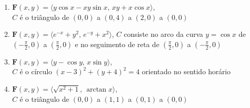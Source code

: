 \documentclass[a4paper, 12pt]{article}
\begin{document}
	\begin{enumerate}[resume]

		\item $\textbf{F}(x,y) = \langle y\cos{x} - xy\sin{x}, \, xy + x\cos{x} \rangle$, \\ $C$ é o triângulo de $(0,0)$ a $(0,4)$ a $(2,0)$ a $(0,0)$

		\item $\textbf{F}(x,y) = \langle e^{-x} + y^2, \, e^{-y} + x^2 \rangle$, \quad $C$ consiste no arco da curva $y = \cos x$ de $(-\frac{\pi}{2},0)$ a $(\frac{\pi}{2},0)$ e no seguimento de reta de $(\frac{\pi}{2},0)$ a $(-\frac{\pi}{2},0)$

		\item $\textbf{F}(x,y) = \langle y - \cos{y}, \, x\sin{y} \rangle$, \\ $C$ é o círculo $(x-3)^2 + (y+4)^2 = 4$ orientado no sentido horário
		\resposta{$4\pi$}

		\item $\textbf{F}(x,y) = \langle \sqrt{x^2 + 1}, \, \arctan{x} \rangle$, \\ $C$ é o triângulo de $(0,0)$ a $(1,1)$ a $(0,1)$ a $(0,0)$
	
	\end{enumerate}
		
	\vspace{5mm}	
	
\end{document}
